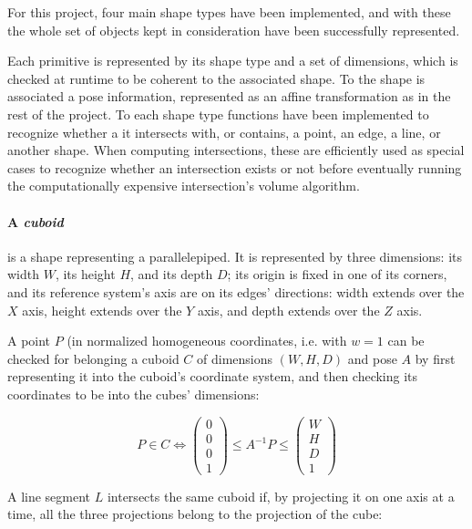 For this project, four main shape types have been implemented, and with these
the whole set of objects kept in consideration have been successfully
represented.

Each primitive is represented by its shape type and a set of dimensions, which
is checked at runtime to be coherent to the associated shape. To the shape is
associated a pose information, represented as an affine transformation as in the
rest of the project. To each shape type functions have been implemented to
recognize whether a it intersects with, or contains, a point, an edge, a line, or
another shape. When computing intersections, these are efficiently used as
special cases to recognize whether an intersection exists or not before
eventually running the computationally expensive intersection's volume
algorithm.

\paragraph{A \emph{cuboid}} is a shape representing a parallelepiped. It is represented by
three dimensions: its width $W$, its height $H$, and its depth $D$; its origin is fixed in one
of its corners, and its reference system's axis are on its edges' directions:
width extends over the $X$ axis, height extends over the $Y$ axis, and depth
extends over the $Z$ axis.

A point $P$ (in normalized homogeneous coordinates, i.e. with $w=1$  can be checked for belonging a cuboid $C$ of dimensions $(W,H,D)$ and
pose $A$ by first representing it into
the cuboid's coordinate system, and then checking its coordinates to be into the
cubes'  dimensions:

\begin{equation}
P \in C \Leftrightarrow \begin{pmatrix}0\\0\\0\\1\end{pmatrix} \leq A^{-1}P \leq
\begin{pmatrix}W\\H\\D\\1\end{pmatrix}
\end{equation}
  
A line segment $L$ intersects the same cuboid if, by projecting it on one axis at a time,
all the three projections belong to the projection of the cube:

